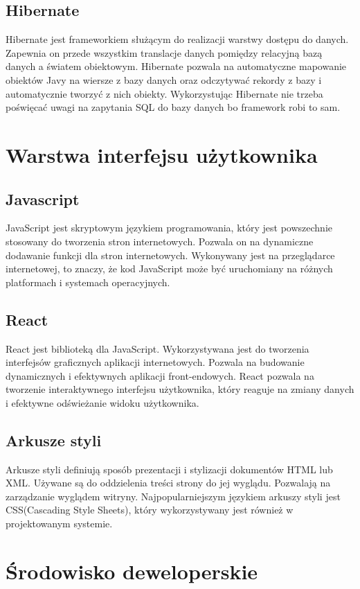 \subsection{Hibernate}
Hibernate jest frameworkiem służącym do realizacji warstwy dostępu do danych. Zapewnia on przede wszystkim translacje danych pomiędzy relacyjną bazą danych a światem obiektowym. Hibernate pozwala na automatyczne mapowanie obiektów Javy na wiersze z bazy danych oraz odczytywać rekordy z bazy i automatycznie tworzyć z nich obiekty. Wykorzystując Hibernate nie trzeba poświęcać uwagi na zapytania SQL do bazy danych bo framework robi to sam.


\section{Warstwa interfejsu użytkownika}
\subsection{Javascript}
JavaScript jest skryptowym językiem programowania, który jest powszechnie stosowany do tworzenia stron internetowych. Pozwala on na dynamiczne dodawanie funkcji dla stron internetowych. Wykonywany jest na przeglądarce internetowej, to znaczy, że kod JavaScript może być uruchomiany na różnych platformach i systemach operacyjnych. 

\subsection{React}
React jest biblioteką dla JavaScript. Wykorzystywana jest do tworzenia interfejsów graficznych aplikacji internetowych. Pozwala na budowanie dynamicznych i efektywnych aplikacji front-endowych. React pozwala na tworzenie interaktywnego interfejsu użytkownika, który reaguje na zmiany danych i efektywne odświeżanie widoku użytkownika.

\subsection{Arkusze styli}
Arkusze styli definiują sposób prezentacji i stylizacji dokumentów HTML lub XML. Używane są do oddzielenia treści strony do jej wyglądu. Pozwalają na zarządzanie wyglądem witryny. Najpopularniejszym językiem arkuszy styli jest CSS(Cascading Style Sheets), który wykorzystywany jest również w projektowanym systemie.
\section{Środowisko deweloperskie}
